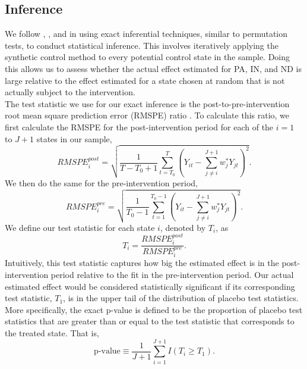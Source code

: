 \documentclass[../Main.tex]{subfiles}
\begin{document}
\subsection{Inference} \label{inference}
We follow \citet{abadie2010synthetic}, \citet{cavallo2013catastrophic}, and \cite{dube2015pooling} in using exact inferential techniques, similar to permutation tests, to conduct statistical inference. This involves iteratively applying the synthetic control method to every potential control state in the sample. Doing this allows us to assess whether the actual effect estimated for PA, IN, and ND is large relative to the effect estimated for a state chosen at random that is not actually subject to the intervention.\\
\indent The test statistic we use for our exact inference is the post-to-pre-intervention root mean square prediction error (RMSPE) ratio \citep{abadie2010synthetic}. To calculate this ratio, we first calculate the RMSPE for the post-intervention period for each of the $i = 1$ to $J+1$ states in our sample,
\begin{equation}
    RMSPE_i^{post} = \sqrt{\frac{1}{T-T_0+1}\sum_{t=T_0}^T\left(Y_{it}-\sum_{j\neq i}^{J+1}w_j^* Y_{jt}\right)^2}.
\end{equation}
We then do the same for the pre-intervention period,
\begin{equation}
    RMSPE_i^{pre} = \sqrt{\frac{1}{T_0 - 1}\sum_{t=1}^{T_0 - 1}\left(Y_{it}-\sum_{j\neq i}^{J+1}w_j^* Y_{jt}\right)^2}.
\end{equation}
We define our test statistic for each state $i$, denoted by $T_i$, as
\begin{equation}
    T_i = \frac{RMSPE_i^{post}}{RMSPE_i^{pre}}.
\end{equation}
Intuitively, this test statistic captures how big the estimated effect is in the post-intervention period relative to the fit in the pre-intervention period. Our actual estimated effect would be considered statistically significant if its corresponding test statistic, $T_1$, is in the upper tail of the distribution of placebo test statistics. More specifically, the exact p-value is defined to be the proportion of placebo test statistics that are greater than or equal to the test statistic that corresponds to the treated state. That is,
\begin{equation} \label{eq:pvalue}
    \text{p-value} \equiv \frac{1}{J+1}\sum_{i=1}^{J+1}I\left(T_i \geq T_1 \right).
\end{equation}
\end{document}

